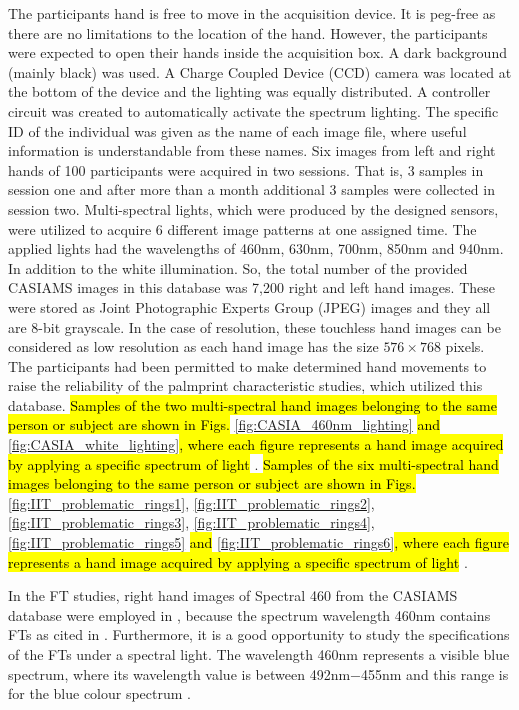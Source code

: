 \documentclass[review]{elsarticle}
\begin{document}
	The participants hand is free to move in the acquisition device. It is peg-free as there are no limitations to the location of the hand. However, the participants were expected to open their hands inside the acquisition box. A dark background (mainly black) was used. A Charge Coupled Device (CCD) camera was located at the bottom of the device and the lighting was equally distributed. A controller circuit was created to automatically activate the spectrum lighting. The specific ID of the individual was given as the name of each image file, where useful information is understandable from these names. Six images from left and right hands of 100 participants were acquired in two sessions. That is, 3 samples in session one and after more than a month additional 3 samples were collected in session two. Multi-spectral lights, which were produced by the designed sensors, were utilized to acquire 6 different image patterns at one assigned time. The applied lights had the wavelengths of 460nm, 630nm, 700nm, 850nm and 940nm. In addition to the white illumination. So, the total number of the provided CASIAMS images in this database was 7,200 right and left hand images. These were stored as Joint Photographic Experts Group (JPEG) images and they all are 8-bit grayscale. In the case of resolution, these touchless hand images can be considered as low resolution as each hand image has the size $576 \times 768$ pixels. The participants had been permitted to make determined hand movements to raise the reliability of the palmprint characteristic studies, which utilized this database. 
	\hl{Samples of the two multi-spectral hand images belonging to the same person or subject are shown in Figs.} \ref{fig:CASIA_460nm_lighting} \hl{and} \ref{fig:CASIA_white_lighting}\hl{, where each figure represents a hand image acquired by applying a specific spectrum of light} \cite{CASIAMS-PalmprintV1}. 
	\hl{Samples of the six multi-spectral hand images belonging to the same person or subject are shown in Figs.} \ref{fig:IIT_problematic_rings1}, \ref{fig:IIT_problematic_rings2}, \ref{fig:IIT_problematic_rings3}, \ref{fig:IIT_problematic_rings4}, \ref{fig:IIT_problematic_rings5} \hl{and} \ref{fig:IIT_problematic_rings6}\hl{, where each figure represents a hand image acquired by applying a specific spectrum of light} \cite{CASIAMS-PalmprintV1}. 

	In the FT studies, right hand images of Spectral 460 from the CASIAMS database were employed in \cite{Al-Nima2017Robust,Al-Nima2017efficient,Al-Nima2017finger}, because the spectrum wavelength 460nm contains FTs as cited in \cite{Khan2011Contour,khan2014multispectral}. Furthermore, it is a good opportunity to study the specifications of the FTs under a spectral light. The wavelength 460nm represents a  visible blue spectrum, where its wavelength value is between 492nm$-$455nm and this range is for the blue colour spectrum \cite{band2006light}. %
	
\end{document}
